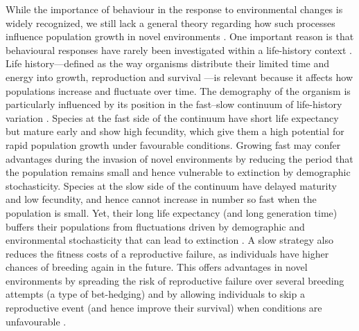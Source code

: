 While the importance of behaviour in the response to
environmental changes is widely recognized, we still lack a
general theory regarding how such processes influence
population growth in novel environments \citep{Sol2016}. One important
reason is that behavioural responses have rarely been
investigated within a life-history context \citep{Sol2016, Ricklefs2004}. Life
history—defined as the way organisms distribute their limited
time and energy into growth, reproduction and
survival \cite{stearns1992evolution}—is relevant because it affects how populations
increase and fluctuate over time. The demography of the
organism is particularly influenced by its position in the
fast–slow continuum of life-history variation \cite{Stearns1983a}. Species
at the fast side of the continuum have short life expectancy
but mature early and show high fecundity, which give
them a high potential for rapid population growth under
favourable conditions. Growing fast may confer advantages
during the invasion of novel environments by reducing the
period that the population remains small and hence vulnerable
to extinction by demographic stochasticity. Species at
the slow side of the continuum have delayed maturity and
low fecundity, and hence cannot increase in number so fast
when the population is small. Yet, their long life expectancy
(and long generation time) buffers their populations from
fluctuations driven by demographic and environmental stochasticity
that can lead to extinction \cite{Saether2013, Saether2004}. A slow strategy
also reduces the fitness costs of a reproductive failure, as individuals
have higher chances of breeding again in the future.
This offers advantages in novel environments by spreading
the risk of reproductive failure over several breeding attempts
(a type of bet-hedging) and by allowing individuals to skip a
reproductive event (and hence improve their survival) when
conditions are unfavourable \cite{Sol2012a}.


